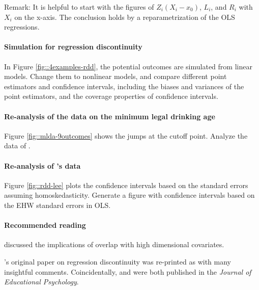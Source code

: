 Remark: It is helpful to start with the figures of $Z_i(X_i - x_0)$, $L_i$, and $R_i$ with $X_i$ on the x-axis. The conclusion holds by a reparametrization of the OLS regressions. 



\paragraph{Simulation for regression discontinuity}

In Figure \ref{fig::4examples-rdd}, the potential outcomes are simulated from linear models. Change them to nonlinear models, and compare different point estimators and confidence intervals, including the biases and variances of the point estimators, and the coverage properties of confidence intervals. 



\paragraph{Re-analysis of the data on the minimum legal drinking age}\label{hw::MLDA}


Figure \ref{fig::mlda-9outcomes} shows the jumps at the cutoff point. 
Analyze the data  of \citet{carpenter2009effect}.

\paragraph{Re-analysis of \citet{lee2008randomized}'s data}\label{hw::lee2008-robust}

Figure \ref{fig::rdd-lee} plots the confidence intervals based on the standard errors assuming homoskedasticity. Generate a figure with confidence intervals based on the EHW standard errors in OLS. 




\paragraph{Recommended reading}

\citet{d2017overlap} discussed the implications of overlap with high dimensional covariates. 

\citet{thistlethwaite1960regression}'s original paper on regression discontinuity was re-printed as \citet{thistlewaiteregression2016obs} with many insightful comments.  Coincidentally, \citet{thistlethwaite1960regression} and \citet{Rubin:1974} were both published in the {\it Journal of Educational Psychology}.
